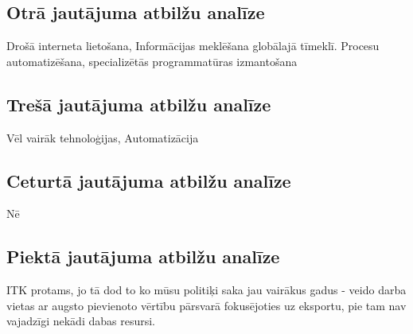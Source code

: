 \subsection{Otrā jautājuma atbilžu analīze}
Drošā interneta lietošana, Informācijas meklēšana globālajā tīmeklī. Procesu automatizēšana, specializētās
programmatūras izmantošana
\subsection{Trešā jautājuma atbilžu analīze}
Vēl vairāk tehnoloģijas,
Automatizācija
\subsection{Ceturtā jautājuma atbilžu analīze}
Nē 
\subsection{Piektā jautājuma atbilžu analīze}
ITK protams, jo tā dod to ko mūsu politiķi saka jau vairākus gadus - veido darba vietas ar augsto pievienoto vērtību
pārsvarā fokusējoties uz eksportu, pie tam nav vajadzīgi nekādi dabas resursi.